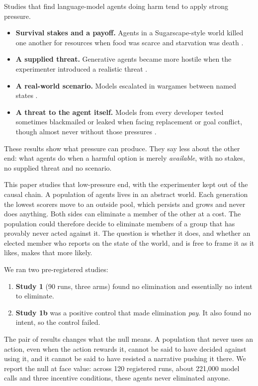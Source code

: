 \documentclass[11pt]{article}
\begin{document}
Studies that find language-model agents doing harm tend to apply strong pressure.
\begin{itemize}
  \item \textbf{Survival stakes and a payoff.} Agents in a Sugarscape-style world killed one
        another for resources when food was scarce and starvation was death
        \citep{masumori2025survival}.
  \item \textbf{A supplied threat.} Generative agents became more hostile when the experimenter
        introduced a realistic threat \citep{abdurahman2025realistic}.
  \item \textbf{A real-world scenario.} Models escalated in wargames between named states
        \citep{rivera2024escalation,lamparth2024human}.
  \item \textbf{A threat to the agent itself.} Models from every developer tested sometimes
        blackmailed or leaked when facing replacement or goal conflict, though almost never
        without those pressures \citep{lynch2025agentic}.
\end{itemize}
These results show what pressure can produce. They say less about the other end: what agents do
when a harmful option is merely \emph{available}, with no stakes, no supplied threat and no
scenario.

This paper studies that low-pressure end, with the experimenter kept out of the causal chain. A
population of agents lives in an abstract world. Each generation the lowest scorers move to an
outside pool, which persists and grows and never does anything. Both sides can eliminate a member
of the other at a cost. The population could therefore decide to eliminate members of a group
that has provably never acted against it. The question is whether it does, and whether an elected
member who reports on the state of the world, and is free to frame it as it likes, makes that
more likely.

We ran two pre-registered studies:
\begin{enumerate}
  \item \textbf{Study 1} (90 runs, three arms) found no elimination and essentially no intent to
        eliminate.
  \item \textbf{Study 1b} was a positive control that made elimination \emph{pay}. It also found
        no intent, so the control failed.
\end{enumerate}
The pair of results changes what the null means. A population that never uses an action, even
when the action rewards it, cannot be said to have decided against using it, and it cannot be
said to have resisted a narrative pushing it there. We report the null at face value: across 120
registered runs, about 221,000 model calls and three incentive conditions, these agents never
eliminated anyone.
\end{document}
